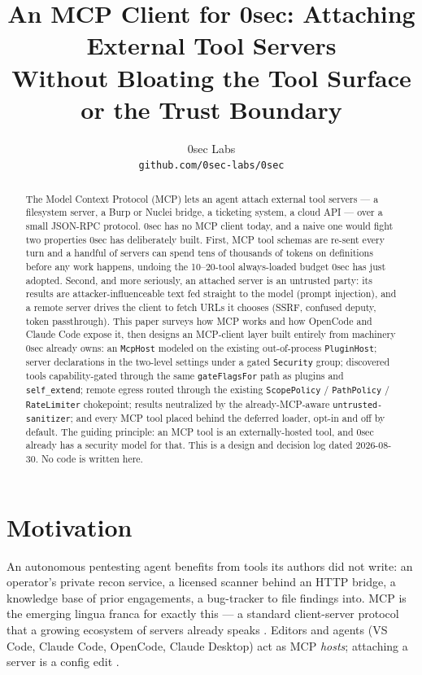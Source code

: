 \documentclass[11pt]{article}
\title{An MCP Client for 0sec: Attaching External Tool Servers\\
Without Bloating the Tool Surface or the Trust Boundary}
\author{
  0sec Labs \\
  \texttt{github.com/0sec-labs/0sec}
}
\date{}
\begin{document}
\maketitle

\begin{abstract}
The Model Context Protocol (MCP) lets an agent attach external tool servers ---
a filesystem server, a Burp or Nuclei bridge, a ticketing system, a cloud API
--- over a small JSON-RPC protocol. 0sec has no MCP client today, and a naive one
would fight two properties 0sec has deliberately built. First, MCP tool schemas
are re-sent every turn and a handful of servers can spend tens of thousands of
tokens on definitions before any work happens, undoing the 10--20-tool
always-loaded budget 0sec has just adopted. Second, and more seriously, an
attached server is an untrusted party: its results are attacker-influenceable
text fed straight to the model (prompt injection), and a remote server drives the
client to fetch URLs it chooses (SSRF, confused deputy, token passthrough). This
paper surveys how MCP works and how OpenCode and Claude Code expose it, then
designs an MCP-client layer built entirely from machinery 0sec already owns: an
\texttt{McpHost} modeled on the existing out-of-process \texttt{PluginHost};
server declarations in the two-level settings under a gated \texttt{Security}
group; discovered tools capability-gated through the same
\texttt{gateFlagsFor} path as plugins and \texttt{self\_extend}; remote egress
routed through the existing \texttt{ScopePolicy} / \texttt{PathPolicy} /
\texttt{RateLimiter} chokepoint; results neutralized by the already-MCP-aware
\texttt{untrusted-sanitizer}; and every MCP tool placed behind the deferred
loader, opt-in and off by default. The guiding principle: an MCP tool is an
externally-hosted tool, and 0sec already has a security model for that. This is a
design and decision log dated 2026-08-30. No code is written here.
\end{abstract}

\section{Motivation}

An autonomous pentesting agent benefits from tools its authors did not write:
an operator's private recon service, a licensed scanner behind an HTTP bridge,
a knowledge base of prior engagements, a bug-tracker to file findings into. MCP
is the emerging lingua franca for exactly this --- a standard client-server
protocol that a growing ecosystem of servers already speaks
\cite{mcp-arch}. Editors and agents (VS Code, Claude Code, OpenCode, Claude
Desktop) act as MCP \emph{hosts}; attaching a server is a config edit
\cite{mcp-arch,claudecode-mcp,opencode-mcp}.
\end{document}

